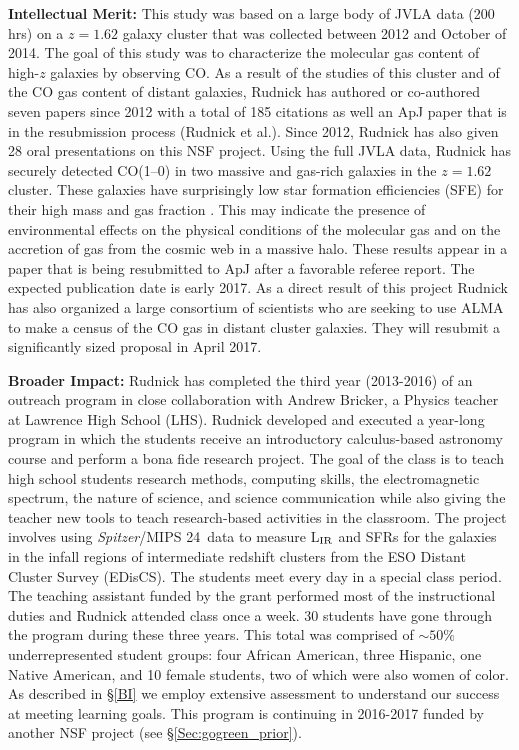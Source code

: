 \documentclass[11pt, preprint]{aastex}
\begin{document}
{\textbf{Intellectual Merit:} This study was based on a large body of
JVLA data (200 hrs) on a $z=1.62$ galaxy cluster that was collected
between 2012 and October of 2014. The goal of this study was to
characterize the molecular gas content of high-$z$ galaxies by
observing CO. As a result of the studies of this cluster and of the CO
gas content of distant galaxies, Rudnick has authored or co-authored
seven papers since 2012 with a total of 185 citations
\citep{papovich12,rudnick12,lotz13,geach13,wong14,geach14,tran15} as
well an ApJ paper that is in the resubmission process (Rudnick et
al.).  Since 2012, Rudnick has also given 28 oral presentations on
this NSF project.
%
Using the full JVLA data, Rudnick has securely detected CO(1--0) in
two massive and gas-rich galaxies in the $z=1.62$ cluster. These
galaxies have surprisingly low star formation efficiencies (SFE) for
their high mass and gas fraction \citep[e.g.][]{genzel10}. This may
indicate the presence of environmental effects on the physical
conditions of the molecular gas and on the accretion of gas from the
cosmic web in a massive halo. These results appear in a paper that is
being resubmitted to ApJ after a favorable referee report.  The
expected publication date is early 2017.  As a direct result of this
project Rudnick has also organized a large consortium of scientists
who are seeking to use ALMA to make a census of the CO gas in distant
cluster galaxies.  They will resubmit a significantly sized proposal in
April 2017.

\textbf{Broader Impact:} Rudnick has completed the third year
(2013-2016) of an outreach program in close collaboration with Andrew
Bricker, a Physics teacher at Lawrence High School (LHS). Rudnick
developed and executed a year-long program in which the students
receive an introductory calculus-based astronomy course and perform a
bona fide research project. The goal of the class is to teach high
school students research methods, computing skills, the
electromagnetic spectrum, the nature of science, and science
communication while also giving the teacher new tools to teach
research-based activities in the classroom.  The project involves
using \textit{Spitzer}/MIPS 24\micron\ data to measure L$_{\rm IR}$
and SFRs for the galaxies in the infall regions of intermediate
redshift clusters from the ESO Distant Cluster Survey (EDisCS). The
students meet every day in a special class period. The teaching
assistant funded by the grant performed most of the instructional
duties and Rudnick attended class once a week.  30 students have gone
through the program during these three years.  This total was
comprised of $\sim 50\%$ underrepresented student groups: four African
American, three Hispanic, one Native American, and 10 female students,
two of which were also women of color.  As described in \S\ref{BI} we
employ extensive assessment to understand our success at meeting
learning goals.  This program is continuing in 2016-2017 funded by
another NSF project (see \S\ref{Sec:gogreen_prior}).

}
\end{document}
